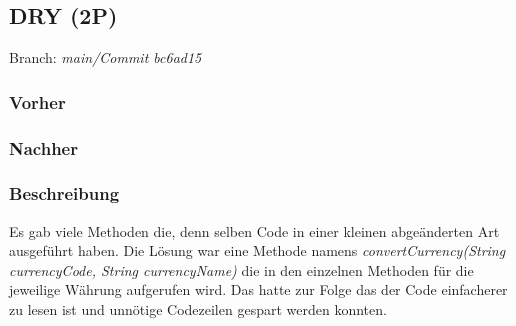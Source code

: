 \subsection{DRY (2P)}

Branch: \textit{main/Commit bc6ad15} 
\subsubsection*{Vorher}

\subsubsection*{Nachher}

\subsubsection*{Beschreibung}
Es gab viele Methoden die, denn selben Code in einer kleinen abgeänderten Art ausgeführt haben. Die Lösung war eine Methode namens \textit{convertCurrency(String currencyCode, String currencyName)} die in den einzelnen Methoden für die jeweilige Währung aufgerufen wird.
\newline\newline
Das hatte zur Folge das der Code einfacherer zu lesen ist und unnötige Codezeilen gespart werden konnten. 
